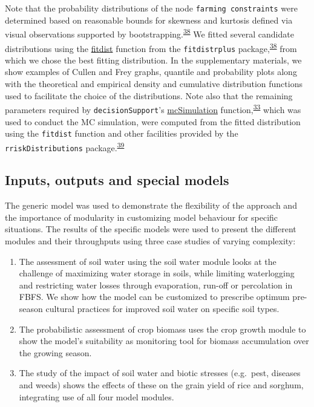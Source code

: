 \documentclass[]{elsarticle} %
\begin{document}
Note that the probability distributions of the node \texttt{farming\ constraints} were determined based on reasonable bounds for skewness and kurtosis defined via visual observations supported by bootstrapping.\textsuperscript{\protect\hyperlink{ref-Delignette-Muller_and_Dutang_2015}{38}} We fitted several candidate distributions using the \href{https://www.rdocumentation.org/packages/fitdistrplus/versions/1.0-14/topics/fitdist}{fitdist} function from the \texttt{fitdistrplus} package,\textsuperscript{\protect\hyperlink{ref-Delignette-Muller_and_Dutang_2015}{38}} from which we chose the best fitting distribution. In the supplementary materials, we show examples of Cullen and Frey graphs, quantile and probability plots along with the theoretical and empirical density and cumulative distribution functions used to facilitate the choice of the distributions. Note also that the remaining parameters required by \texttt{decisionSupport}'s \href{https://www.rdocumentation.org/packages/decisionSupport/versions/1.103.8/topics/mcSimulation}{mcSimulation} function,\textsuperscript{\protect\hyperlink{ref-Luedeling_Goehring_et_al_2019}{33}} which was used to conduct the MC simulation, were computed from the fitted distribution using the \texttt{fitdist} function and other facilities provided by the \texttt{rriskDistributions} package.\textsuperscript{\protect\hyperlink{ref-Belgorodski_et_al_2017}{39}}

\hypertarget{ref36}{%
\subsection{Inputs, outputs and special models}\label{ref36}}

The generic model was used to demonstrate the flexibility of the approach and the importance of modularity in customizing model behaviour for specific situations. The results of the specific models were used to present the different modules and their throughputs using three case studies of varying complexity:

\begin{enumerate}
\def\labelenumi{\arabic{enumi}.}
\item
  The assessment of soil water using the soil water module looks at the challenge of maximizing water storage in soils, while limiting waterlogging and restricting water losses through evaporation, run-off or percolation in FBFS. We show how the model can be customized to prescribe optimum pre-season cultural practices for improved soil water on specific soil types.
\item
  The probabilistic assessment of crop biomass uses the crop growth module to show the model's suitability as monitoring tool for biomass accumulation over the growing season.
\item
  The study of the impact of soil water and biotic stresses (e.g.~pest, diseases and weeds) shows the effects of these on the grain yield of rice and sorghum, integrating use of all four model modules.
\end{enumerate}
\end{document}
